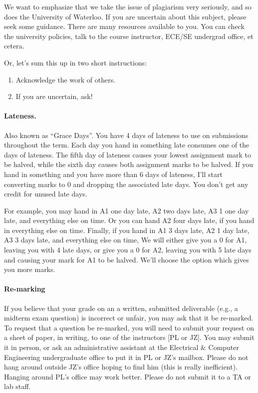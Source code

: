 \documentclass[letterpaper,10pt]{article}
\begin{document}
We want to emphasize that we take the issue of plagiarism very seriously, and so does the University of Waterloo. If you are uncertain about this subject, please seek some guidance. There are many resources available to you. You can check the university policies, talk to the course instructor, ECE/SE undergrad office, et cetera.

Or, let's sum this up in two short instructions:
\begin{enumerate}
	\item Acknowledge the work of others. 
	\item If you are uncertain, ask!
\end{enumerate}


\paragraph{Lateness.} Also known as ``Grace Days''. You have 4 days of lateness to use on 
submissions throughout the term. Each day you hand in something late
consumes one of the days of lateness. The fifth day of lateness causes
your lowest assignment mark to be halved, while the sixth day causes
both assignment marks to be halved. If you hand in something and you
have more than 6 days of lateness, I'll start converting marks to 0
and dropping the associated late days. You don't
get any credit for unused late days.

For example, you may hand in A1 one day late, A2 two days late, A3 1
one day late, and everything else on time.  Or you can hand A2 four
days late, if you hand in everything else on time. Finally, if you
hand in A1 3 days late, A2 1 day late, A3 3 days late, and
everything else on time, We will either give you a 0 for A1, leaving you
with 4 late days, or give you a 0 for A2, leaving you with 5 late days
and causing your mark for A1 to be halved. We'll choose the option
which gives you more marks.

\paragraph{Re-marking}
If you believe that your grade on an a written, submitted deliverable (e.g., a midterm exam question) is incorrect or unfair, you may ask that it be re-marked. To request that a question be re-marked, you will need to submit your request on a sheet of paper, in writing, to one of the instructors [PL or JZ]. You may submit it in person, or ask an administrative assistant at the Electrical \& Computer Engineering undergraduate office to put it in PL or JZ's mailbox. Please do not hang around outside JZ's office hoping to find him (this is really inefficient). Hanging around PL's office may work better. Please do not submit it to a TA or lab staff.
\end{document}
